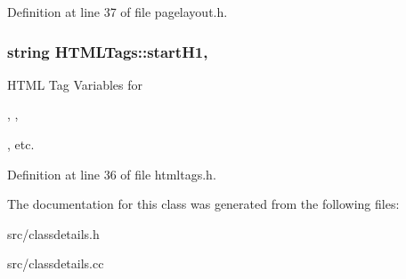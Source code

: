 Definition at line 37 of file pagelayout.\-h.

\hypertarget{classHTMLTags_ae987289d0dab2e3e234048615f930d0f}{
\subsubsection[{start\-H1}]{\setlength{\rightskip}{0pt plus 5cm}string H\-T\-M\-L\-Tags\-::start\-H1\hspace{0.3cm}{\ttfamily [protected]}, {\ttfamily [inherited]}}}\label{classHTMLTags_ae987289d0dab2e3e234048615f930d0f}


H\-T\-M\-L Tag Variables for 

, , 

, etc. 



Definition at line 36 of file htmltags.\-h.



The documentation for this class was generated from the following files\-:\begin{DoxyCompactItemize}
\item 
src/classdetails.\-h\item 
src/classdetails.\-cc\end{DoxyCompactItemize}

